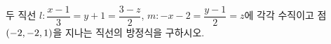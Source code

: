 두 직선 $l\colon \dfrac{x-1}{3}=y+1=\dfrac{3-z}{2}$, $m\colon {-x}-2=\dfrac{y-1}{2}=z$에 각각 수직이고 점~$(-2{,}\mkern3mu\mathopen{}-2{,}\mkern3mu\mathopen{}1)$을 지나는 직선의 방정식을 구하시오.
